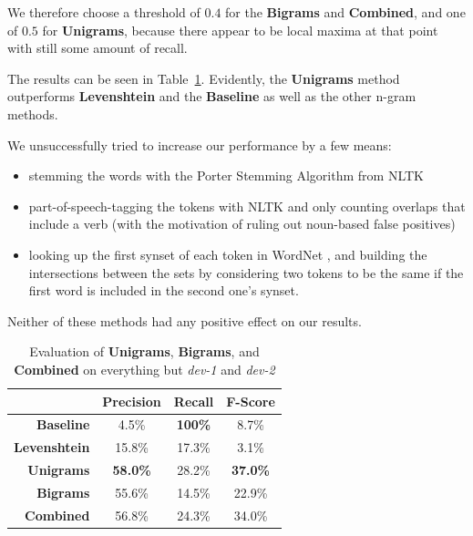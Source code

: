 \documentclass[a4paper,10pt]{scrartcl}
\theoremstyle{style}
\begin{document}
We therefore choose a threshold of $0.4$ for the \textbf{Bigrams} and \textbf{Combined}, and one of $0.5$ for \textbf{Unigrams}, because there appear to be local maxima at that point with still some amount of recall.

The results can be seen in Table~\ref{eval_redundancy}. Evidently, the \textbf{Unigrams} method outperforms \textbf{Levenshtein} and the \textbf{Baseline} as well as the other n-gram methods.

We unsuccessfully tried to increase our performance by a few means:

\begin{itemize}
\item stemming the words with the Porter Stemming Algorithm \citep{porter1980algorithm} from NLTK \citep{bird2009natural}
\item part-of-speech-tagging the tokens with NLTK and only counting overlaps that include a verb (with the motivation of ruling out noun-based false positives)
\item looking up the first synset of each token in WordNet \citep{fellbaum2005wordnet}, and building the intersections between the sets by considering two tokens to be the same if the first word is included in the second one's synset.
\end{itemize}

Neither of these methods had any positive effect on our results.

\begin{table}
\begin{center}
\begin{tabular}{r|c|c|c|}
& Precision & Recall & F-Score \\
\hline
\textbf{Baseline} & 4.5\% & \textbf{100\%} & 8.7\% \\
\hline
\textbf{Levenshtein} & 15.8\% & 17.3\% & 3.1\% \\
\hline
\textbf{Unigrams} & \textbf{58.0\%} & 28.2\% & \textbf{37.0\%} \\
\hline
\textbf{Bigrams} & 55.6\% & 14.5\% & 22.9\% \\
\hline
\textbf{Combined} & 56.8\% & 24.3\% & 34.0\% \\
\hline
\end{tabular}
\end{center}
\caption{Evaluation of \textbf{Unigrams}, \textbf{Bigrams}, and \textbf{Combined} on everything but \textit{dev-1} and \textit{dev-2}}
\label{eval_redundancy}
\end{table}
\end{document}
